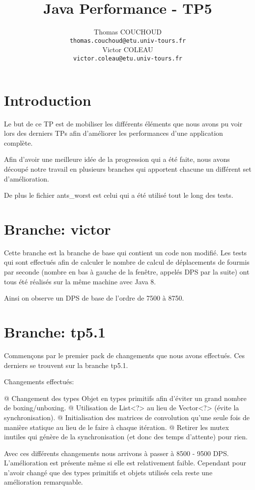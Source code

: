 \documentclass{report}
\title{Java Performance - TP5}
\author{Thomas COUCHOUD\\\texttt{thomas.couchoud@etu.univ-tours.fr}\\Victor COLEAU\\\texttt{victor.coleau@etu.univ-tours.fr}}
\begin{document}
	\mccTitle
	\chapter{Introduction}
		Le but de ce TP est de mobiliser les différents éléments que nous avons pu voir lors des derniers TPs afin d'améliorer les performances d'une application complète.
		
		Afin d'avoir une meilleure idée de la progression qui a été faite, nous avons découpé notre travail en plusieurs branches qui apportent chacune un différent set d'amélioration.
		
		De plus le fichier ants\_worst est celui qui a été utilisé tout le long des tests.
	
	\chapter{Branche: victor}
		Cette branche est la branche de base qui contient un code non modifié.
		Les tests qui sont effectués afin de calculer le nombre de calcul de déplacements de fourmis par seconde (nombre en bas à gauche de la fenêtre, appelés DPS par la suite) ont tous été réalisés sur la même machine avec Java 8.
		
		
		Ainsi on observe un DPS de base de l'ordre de 7500 à 8750.
	
	\chapter{Branche: tp5.1}
		Commençons par le premier pack de changements que nous avons effectués.
		Ces derniers se trouvent sur la branche tp5.1.
	
		Changements effectués:
		\begin{easylist}[itemize]
			@ Changement des types Objet en types primitifs afin d'éviter un grand nombre de boxing/unboxing.
			@ Utilisation de List<?> au lieu de Vector<?> (évite la synchronisation).
			@ Initialisation des matrices de convolution qu'une seule fois de manière statique au lieu de le faire à chaque itération.
			@ Retirer les mutex inutiles qui génère de la synchronisation (et donc des temps d'attente) pour rien.
		\end{easylist}
		
		Avec ces différents changements nous arrivons à passer à 8500 - 9500 DPS.
		L'amélioration est présente même si elle est relativement faible.
		Cependant pour n'avoir changé que des types primitifs et objets utilisés cela reste une amélioration remarquable.
		
\end{document}

